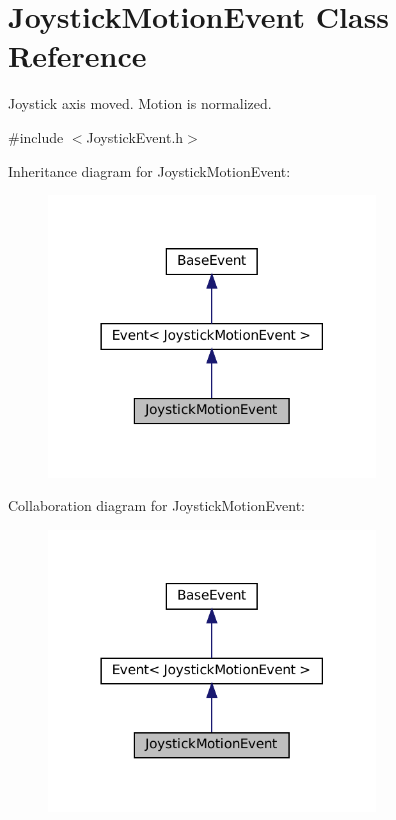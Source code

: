 \hypertarget{classJoystickMotionEvent}{}\section{Joystick\+Motion\+Event Class Reference}
\label{classJoystickMotionEvent}


Joystick axis moved. Motion is normalized.  




{\ttfamily \#include $<$Joystick\+Event.\+h$>$}



Inheritance diagram for Joystick\+Motion\+Event\+:\nopagebreak
\begin{figure}[H]
\begin{center}
\leavevmode
\includegraphics[width=246pt]{classJoystickMotionEvent__inherit__graph}
\end{center}
\end{figure}


Collaboration diagram for Joystick\+Motion\+Event\+:\nopagebreak
\begin{figure}[H]
\begin{center}
\leavevmode
\includegraphics[width=246pt]{classJoystickMotionEvent__coll__graph}
\end{center}
\end{figure}

